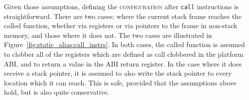 \begin{itemize}
  Given those assumptions, defining the \textsc{configuration} after
  \texttt{call} instructions is straightforward.  There are two cases:
  where the current stack frame reaches the called function, whether
  via registers or via pointers to the frame in non-stack memory, and
  those where it does not.  The two cases are illustrated in
  Figure~\ref{fig:static_alias:call_instrs}.  In both cases, the
  called function is assumed to clobber all of the registers which are
  defined as call clobbered in the platform ABI, and to return a value
  in the ABI return register.  In the case where it does receive a
  stack pointer, it is assumed to also write the stack pointer to
  every location which it can reach.  This is safe, provided that the
  assumptions above hold, but is also quite conservative.
\end{itemize}

